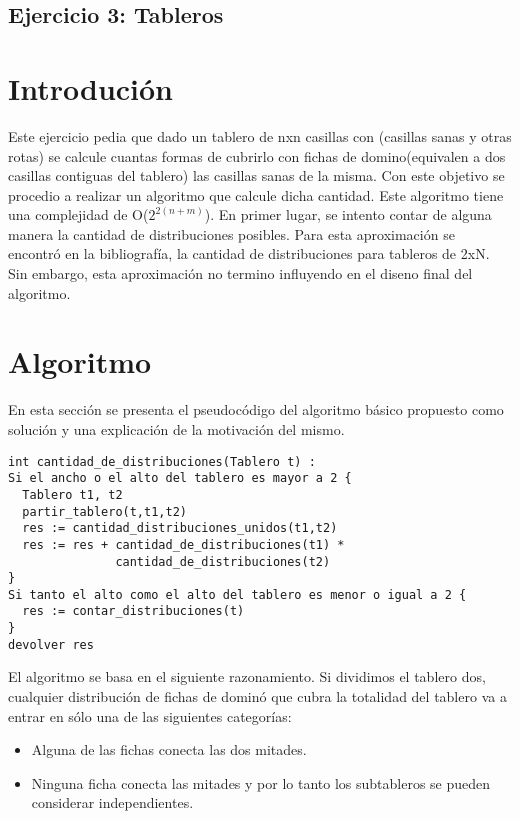 \documentclass[a4paper, 12pt] {article}
\begin{document}
\begin{center}
 \section*{Ejercicio 3: Tableros}
\end{center}

\bigskip
\section*{Introduci\'on}
Este ejercicio pedia que dado un tablero de nxn casillas con (casillas sanas y otras rotas) se calcule cuantas formas de cubrirlo con fichas de domino(equivalen a dos casillas contiguas del tablero) las casillas sanas de la misma.
Con este objetivo se procedio a realizar un algoritmo que calcule dicha cantidad. Este algoritmo tiene una complejidad de O($2^{2\left(n+m \right) }$). En primer lugar, se intento contar de alguna manera la cantidad de distribuciones posibles. Para esta aproximaci\'on se encontr\'o en la bibliograf\'ia, la cantidad de distribuciones para tableros de 2xN. Sin embargo, esta aproximaci\'on no termino influyendo en el diseno final del algoritmo.
\section*{Algoritmo}
En esta secci\'on se presenta el pseudoc\'odigo del algoritmo b\'asico propuesto como soluci\'on y una explicaci\'on de la motivaci\'on del mismo.
\begin{verbatim}
int cantidad_de_distribuciones(Tablero t) :
Si el ancho o el alto del tablero es mayor a 2 {
  Tablero t1, t2
  partir_tablero(t,t1,t2)
  res := cantidad_distribuciones_unidos(t1,t2) 
  res := res + cantidad_de_distribuciones(t1) * 
               cantidad_de_distribuciones(t2)
}
Si tanto el alto como el alto del tablero es menor o igual a 2 {
  res := contar_distribuciones(t)
}
devolver res
\end{verbatim}

El algoritmo se basa en el siguiente razonamiento.
Si dividimos el tablero dos, cualquier distribuci\'on de fichas de domin\'o que cubra la totalidad del tablero va a entrar en s\'olo una de las siguientes categor\'ias:
\begin{itemize}
 \item Alguna de las fichas conecta las dos mitades.
 \item Ninguna ficha conecta las mitades y por lo tanto los subtableros se pueden considerar independientes.
\end{itemize} 
\end{document}
